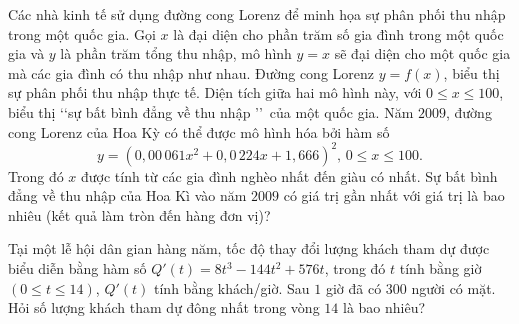\begin{bt}%

	Các nhà kinh tế sử dụng đường cong Lorenz để minh họa sự phân phối thu nhập trong một quốc gia. Gọi $x$ là đại diện cho phần trăm số gia đình trong một quốc gia và $y$ là phần trăm tổng thu nhập, mô hình $y=x$ sẽ đại diện cho một quốc gia mà các gia đình có thu nhập như nhau. Đường cong Lorenz $y=f(x)$, biểu thị sự phân phối thu nhập thực tế. Diện tích giữa hai mô hình này, với $0\leq x\leq 100$, biểu thị \lq\lq sự bất bình đẳng về thu nhập \rq\rq \, của một quốc gia. Năm $2009$, đường cong Lorenz của Hoa Kỳ có thể được mô hình hóa bởi hàm số
	$$
	y=\left(0{,}00\,061x^2+0{,}0\,224x+1{,}666\right)^2,\,0\leq x\leq 100.
	$$
	Trong đó $x$ được tính từ các gia đình nghèo nhất đến giàu có nhất. Sự bất bình đẳng về thu nhập của Hoa Kì vào năm $2009$ có giá trị gần nhất với giá trị là bao nhiêu (kết quả làm tròn đến hàng đơn vị)?\\
\end{bt}


\begin{bt}%

	Tại một lễ hội dân gian hàng năm, tốc độ thay đổi lượng khách tham dự được biểu diễn bằng hàm số $Q'(t)=8t^3-144t^2+576t$, trong đó $t$ tính bằng giờ $(0\leq t \leq 14)$, $Q'(t)$ tính bằng khách/giờ. Sau $1$ giờ đã có $300$ người có mặt. Hỏi số lượng khách tham dự đông nhất trong vòng $14$ là bao nhiêu?
\end{bt}
